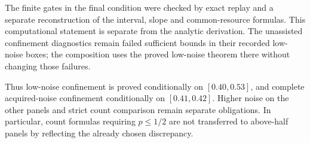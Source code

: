The finite gates in the final condition were checked by exact replay
and a separate reconstruction of the interval, slope and common-resource
formulas. This computational statement is separate from the analytic
derivation. The unassisted confinement diagnostics remain failed
sufficient bounds in their recorded low-noise boxes; the composition
uses the proved low-noise theorem there without changing those failures.

Thus low-noise confinement is proved conditionally on $[0.40,0.53]$,
and complete acquired-noise confinement conditionally on $[0.41,0.42]$.
Higher noise on the other panels and strict count comparison remain
separate obligations. In particular, count formulas requiring $p\le1/2$
are not transferred to above-half panels by reflecting the already
chosen discrepancy.

